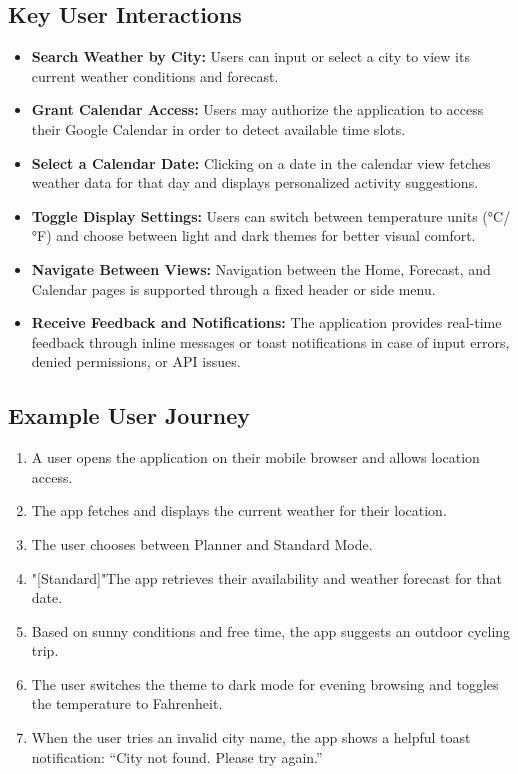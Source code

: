\documentclass[fontsize=13pt,a4paper]{scrartcl}
\begin{document}
\subsection{Key User Interactions}
\begin{itemize}[nosep]
  \item \textbf{Search Weather by City:} Users can input or select a city to view its current weather conditions and forecast.
  \item \textbf{Grant Calendar Access:} Users may authorize the application to access their Google Calendar in order to detect available time slots.
  \item \textbf{Select a Calendar Date:} Clicking on a date in the calendar view fetches weather data for that day and displays personalized activity suggestions.
  \item \textbf{Toggle Display Settings:} Users can switch between temperature units (°C/°F) and choose between light and dark themes for better visual comfort.
  \item \textbf{Navigate Between Views:} Navigation between the Home, Forecast, and Calendar pages is supported through a fixed header or side menu.
  \item \textbf{Receive Feedback and Notifications:} The application provides real-time feedback through inline messages or toast notifications in case of input errors, denied permissions, or API issues.
\end{itemize}

\subsection{Example User Journey}
\begin{enumerate}[nosep]
  \item A user opens the application on their mobile browser and allows location access.
  \item The app fetches and displays the current weather for their location.
  \item The user chooses between Planner and Standard Mode.
  \item "[Standard]"The app retrieves their availability and weather forecast for that date.
  \item Based on sunny conditions and free time, the app suggests an outdoor cycling trip.
  \item The user switches the theme to dark mode for evening browsing and toggles the temperature to Fahrenheit.
  \item When the user tries an invalid city name, the app shows a helpful toast notification: “City not found. Please try again.”
\end{enumerate}
\end{document}

